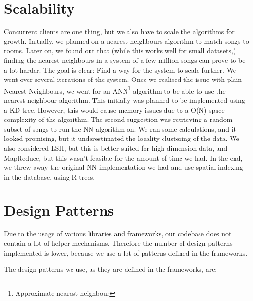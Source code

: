 \section{Scalability}
Concurrent clients are one thing, but we also have to scale the algorithms for growth.
Initially, we planned on a nearest neighbours algorithm to match songs to rooms.
Later on, we found out that (while this works well for small datasets,) finding the nearest neighbours in a system of a few million songs can prove to be a lot harder.
The goal is clear: Find a way for the system to scale further.
We went over several iterations of the system.
Once we realised the issue with plain Nearest Neighbours, we went for an ANN\footnote{Approximate nearest neighbour} algorithm to be able to use the nearest neighbour algorithm.
This initially was planned to be implemented using a \gls{KD-tree}.
However, this would cause memory issues due to a O(N) space complexity of the algorithm.
The second suggestion was retrieving a random subset of songs to run the NN algorithm on.
We ran some calculations, and it looked promising, but it underestimated the locality clustering of the data. 
We also considered \gls{LSH}, but this is better suited for high-dimension data, and MapReduce, but this wasn't feasible for the amount of time we had.
In the end, we threw away the original NN implementation we had and use spatial indexing in the database, using \gls{R-tree}s.

\section{Design Patterns}

Due to the usage of various libraries and frameworks, our codebase does not contain a lot of helper mechanisms.
Therefore the number of design patterns implemented is lower, because we use a lot of patterns defined in the frameworks.

The design patterns we use, as they are defined in the frameworks, are:

